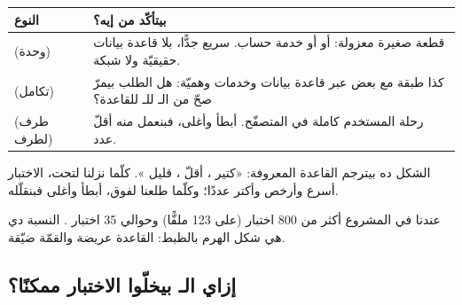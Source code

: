 \begin{center}
\begin{tabular}{L{3.2cm} L{9.2cm}}
\toprule
النوع & بيتأكّد من إيه؟ \\
\midrule
{} (وحدة) & قطعة صغيرة معزولة:  أو  أو خدمة حساب. سريع جدًّا، بلا قاعدة بيانات حقيقيّة ولا شبكة. \\
 (تكامل) & كذا طبقة مع بعض عبر قاعدة بيانات وخدمات وهميّة: هل الطلب  بيمرّ صحّ من الـ  للـ  للقاعدة؟ \\
 (طرف لطرف) & رحلة المستخدم كاملة في المتصفّح. أبطأ وأغلى، فبنعمل منه أقلّ عدد. \\
\bottomrule
\end{tabular}
\end{center}

الشكل ده بيترجم القاعدة المعروفة: «كتير ، أقلّ ، قليل ». كلّما نزلنا لتحت، الاختبار أسرع وأرخص وأكتر عددًا؛ وكلّما طلعنا لفوق، أبطأ وأغلى فبنقلّله.

\begin{center}\begin{LTR}
\end{LTR}\end{center}

\begin{note}
عندنا في المشروع أكثر من \textenglish{800} اختبار  (على \textenglish{123} ملفًّا) وحوالي \textenglish{35} اختبار . النسبة دي هي شكل الهرم بالظبط: القاعدة عريضة والقمّة ضيّقة.
\end{note}

\subsection{إزاي الـ  بيخلّوا الاختبار ممكنًا؟}

